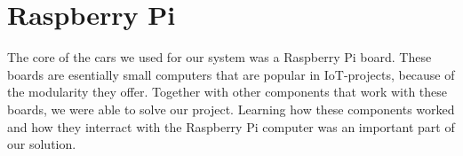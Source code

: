 \section{Raspberry Pi}
The core of the cars we used for our system was a Raspberry Pi board. These boards are esentially small computers that are popular in IoT-projects, because of the modularity they offer. Together with other components that work with these boards, we were able to solve our project. Learning how these components worked and how they interract with the Raspberry Pi computer was an important part of our solution.  
